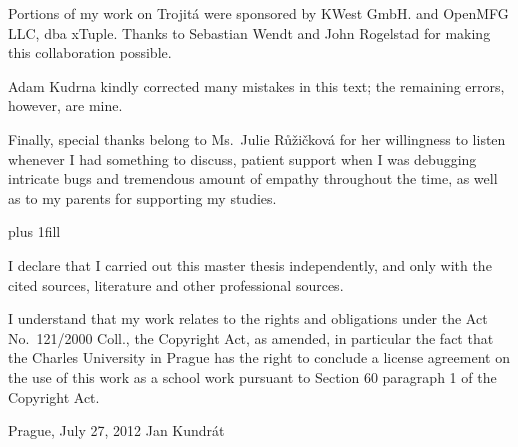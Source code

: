 \documentclass[11pt,a4paper]{report}
\begin{document}
Portions of my work on Trojitá were sponsored by KWest GmbH. and OpenMFG LLC, dba xTuple.  Thanks to Sebastian Wendt and
John Rogelstad for making this collaboration possible.

Adam Kudrna kindly corrected many mistakes in this text; the remaining errors, however, are mine.

Finally, special thanks belong to Ms.~Julie Růžičková for her willingness to listen whenever I had something to
discuss, patient support when I was debugging intricate bugs and tremendous amount of empathy throughout the time, as
well as to my parents for supporting my studies.
\newpage

\vglue 0pt plus 1fill

\noindent
I declare that I carried out this master thesis independently, and only with the cited sources, literature and other
professional sources.

\medskip\noindent
I understand that my work relates to the rights and obligations under the Act No.~121/2000 Coll., the Copyright Act, as
amended, in particular the fact that the Charles University in Prague has the right to conclude a license agreement on
the use of this work as a school work pursuant to Section 60 paragraph 1 of the Copyright Act.

\vspace{30mm}

\noindent Prague, July 27, 2012 \hspace{\fill}Jan Kundrát\\

\vspace{20mm}
\newpage
\end{document}
